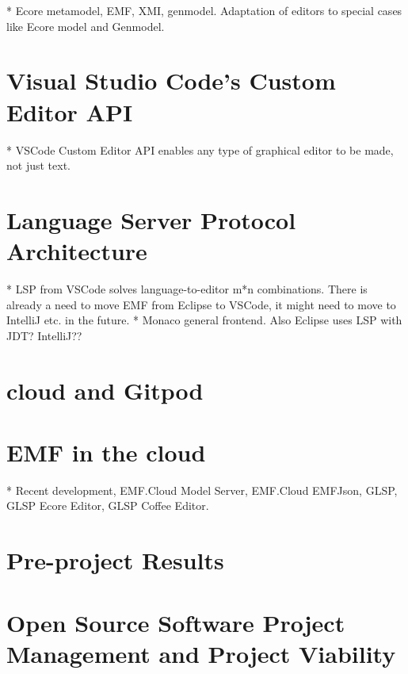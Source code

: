 * Ecore metamodel, EMF, XMI, genmodel. Adaptation of editors to special cases like Ecore model and Genmodel.

\section{Visual Studio Code's Custom Editor API}\label{sec:vscode-custom-editor}
* VSCode Custom Editor API enables any type of graphical editor to be made, not just text.

\section{Language Server Protocol Architecture}\label{sec:lsp}
* LSP from VSCode solves language-to-editor m*n combinations. There is already a need to move EMF from Eclipse to VSCode, it might need to move to IntelliJ etc. in the future.
* Monaco general frontend. Also Eclipse uses LSP with JDT? IntelliJ??

\section{\Gls{cloud} and \gls{Gitpod}}

\section{\acrlong{EMF} in the \Gls{cloud}}
* Recent development, EMF.Cloud Model Server, EMF.Cloud EMFJson, GLSP, GLSP Ecore Editor, GLSP Coffee Editor.

\section{Pre-project Results}




\section{Open Source Software Project Management and Project Viability}

